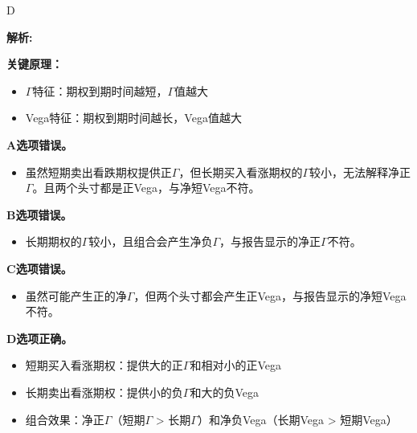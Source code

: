 \documentclass{article}
\newenvironment{explanation}
{\textbf{解析:}\par}
{\par}
\begin{document}
                \begin{correctanswer}
                D
                \end{correctanswer}
                
                \begin{explanation}
                
                \textbf{关键原理：}
                \begin{itemize}
                    \item \(\Gamma\)特征：期权到期时间越短，\(\Gamma\)值越大
                    \item Vega特征：期权到期时间越长，Vega值越大
                \end{itemize}
                
                \textbf{A选项错误。} 
                \begin{itemize}
                    \item 虽然短期卖出看跌期权提供正\(\Gamma\)，但长期买入看涨期权的\(\Gamma\)较小，无法解释净正\(\Gamma\)。且两个头寸都是正Vega，与净短Vega不符。
                \end{itemize}
                
                \textbf{B选项错误。} 
                \begin{itemize}
                    \item 长期期权的\(\Gamma\)较小，且组合会产生净负\(\Gamma\)，与报告显示的净正\(\Gamma\)不符。
                \end{itemize}
                
                \textbf{C选项错误。} 
                \begin{itemize}
                    \item 虽然可能产生正的净\(\Gamma\)，但两个头寸都会产生正Vega，与报告显示的净短Vega不符。
                \end{itemize}
                
                \textbf{D选项正确。} 
                \begin{itemize}
                    \item 短期买入看涨期权：提供大的正\(\Gamma\)和相对小的正Vega
                    \item 长期卖出看涨期权：提供小的负\(\Gamma\)和大的负Vega
                    \item 组合效果：净正\(\Gamma\)（短期\(\Gamma\) > 长期\(\Gamma\)）和净负Vega（长期Vega > 短期Vega）
                \end{itemize}
                \end{explanation}
                
\end{document}
